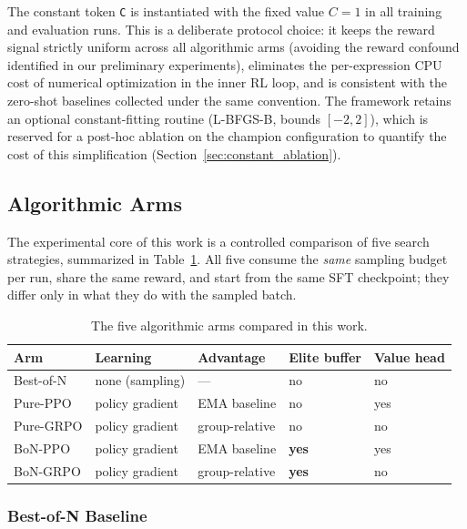 The constant token \texttt{C} is instantiated with the fixed value $C=1$ in all training and evaluation runs. This is a deliberate protocol choice: it keeps the reward signal strictly uniform across all algorithmic arms (avoiding the reward confound identified in our preliminary experiments), eliminates the per-expression CPU cost of numerical optimization in the inner RL loop, and is consistent with the zero-shot baselines collected under the same convention. The framework retains an optional constant-fitting routine (L-BFGS-B, bounds $[-2, 2]$), which is reserved for a post-hoc ablation on the champion configuration to quantify the cost of this simplification (Section~\ref{sec:constant_ablation}).

\subsection{Algorithmic Arms}
\label{sec:algorithms}

The experimental core of this work is a controlled comparison of five search strategies, summarized in Table~\ref{tab:rl_algorithms}. All five consume the \emph{same} sampling budget per run, share the same reward, and start from the same SFT checkpoint; they differ only in what they do with the sampled batch.

\begin{table}[htbp]
    \centering
    \caption{The five algorithmic arms compared in this work.}
    \label{tab:rl_algorithms}
    \begin{tabular}{lllll}
    \toprule
    \textbf{Arm} & \textbf{Learning} & \textbf{Advantage} & \textbf{Elite buffer} & \textbf{Value head} \\
    \midrule
    Best-of-N & none (sampling) & --- & no & no \\
    Pure-PPO & policy gradient & EMA baseline & no & yes \\
    Pure-GRPO & policy gradient & group-relative & no & no \\
    BoN-PPO & policy gradient & EMA baseline & \textbf{yes} & yes \\
    BoN-GRPO & policy gradient & group-relative & \textbf{yes} & no \\
    \bottomrule
    \end{tabular}
\end{table}

\subsubsection{Best-of-N Baseline}

